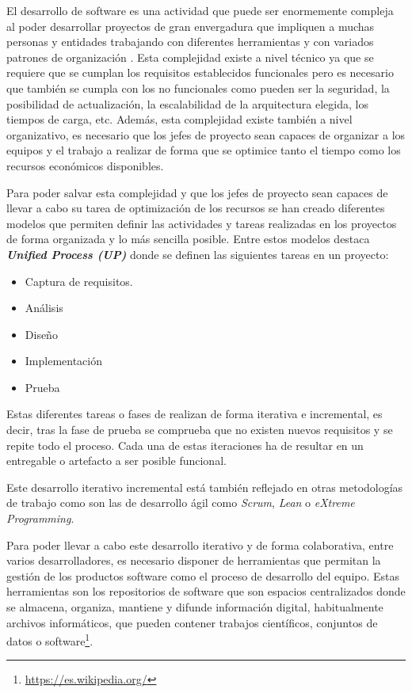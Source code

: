 

El desarrollo de software es una actividad que puede ser enormemente compleja al poder desarrollar proyectos de gran envergadura que impliquen a muchas personas y entidades trabajando con diferentes herramientas y con variados patrones de organización \cite{jacobson_proceso_2000}. Esta complejidad existe a nivel técnico ya que se requiere que se cumplan los requisitos establecidos funcionales pero es necesario que también se cumpla con los no funcionales como pueden ser la seguridad, la posibilidad de actualización, la escalabilidad de la arquitectura elegida, los tiempos de carga, etc.
Además, esta complejidad existe también a nivel organizativo, es necesario que los jefes de proyecto sean capaces de organizar a los equipos y el trabajo a realizar de forma que se optimice tanto el tiempo como los recursos económicos disponibles.

Para poder salvar esta complejidad y que los jefes de proyecto sean capaces de llevar a cabo su tarea de optimización de los recursos se han creado diferentes modelos que permiten definir las actividades y tareas realizadas en los proyectos de forma organizada y lo más sencilla posible. Entre estos modelos destaca \textit{\textbf{Unified Process (UP)}} \cite{jacobson_proceso_2000} donde se definen las siguientes tareas en un proyecto: 

\begin{itemize}
	\item Captura de requisitos.
	\item Análisis
	\item Diseño
	\item Implementación
	\item Prueba
\end{itemize}

Estas diferentes tareas o fases de realizan de forma iterativa e incremental, es decir, tras la fase de prueba se comprueba que no existen nuevos requisitos y se repite todo el proceso. Cada una de estas iteraciones ha de resultar en un entregable o artefacto a ser posible funcional.

Este desarrollo iterativo incremental está también reflejado en otras metodologías de trabajo como son las de desarrollo ágil como \textit{Scrum}, \textit{Lean} o \textit{eXtreme Programming}.


Para poder llevar a cabo este desarrollo iterativo y de forma colaborativa, entre varios desarrolladores, es necesario disponer de herramientas que permitan la gestión de los productos software como el proceso de desarrollo del equipo. Estas herramientas son los repositorios de software que son espacios centralizados donde se almacena, organiza, mantiene y difunde información digital, habitualmente archivos informáticos, que pueden contener trabajos científicos, conjuntos de datos o software\footnote{\url{https://es.wikipedia.org/}}. 

